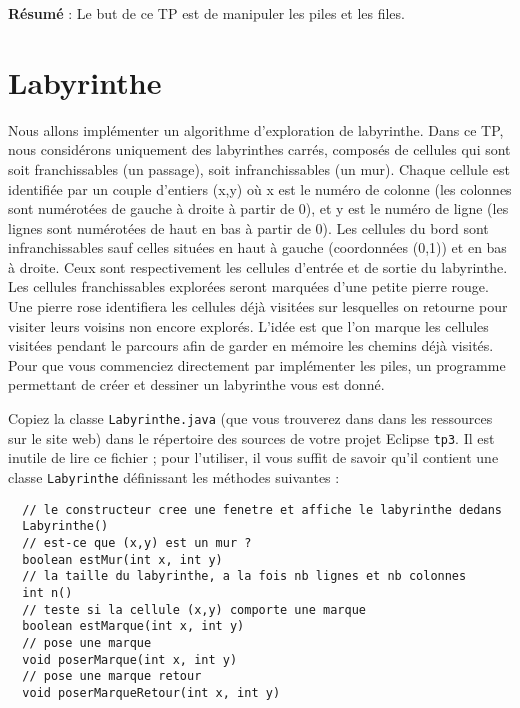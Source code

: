 \documentclass[iutinfo,a4paper,nocorrections,10pt]{ustl-tdtp}
\date{\annee{2017}--\annee{2018}}
\begin{document}
\maketitle
\thispagestyle{empty}


\sloppy
\textbf{Résumé }: Le but de ce TP est de manipuler les piles et les files.
\section{Labyrinthe}


Nous allons implémenter un algorithme d'exploration de labyrinthe. Dans ce TP, nous considérons uniquement des
labyrinthes carrés, composés de cellules qui sont soit franchissables (un passage), soit infranchissables (un mur). Chaque cellule est identifiée par un couple d’entiers (x,y) où x est le numéro de colonne (les colonnes sont numérotées de gauche
à droite à partir de 0), et y est le numéro de ligne (les lignes sont numérotées de haut en bas à partir de 0). Les
cellules du bord sont infranchissables sauf celles situées en haut à gauche (coordonnées (0,1)) et en bas à droite. Ceux sont
respectivement les cellules d'entrée et de sortie du labyrinthe.
Les cellules franchissables explorées seront marquées d’une petite pierre rouge. Une pierre rose identifiera les cellules déjà visitées sur lesquelles on retourne pour visiter leurs voisins non encore explorés. L'idée est que l'on
marque les cellules visitées pendant le parcours afin de garder en mémoire les chemins déjà visités.
Pour que vous commenciez directement par implémenter les piles, un programme permettant de créer et dessiner un
labyrinthe vous est donné.


Copiez la classe \texttt{Labyrinthe.java} (que vous trouverez dans dans les
ressources sur le site web) dans le répertoire des sources de votre projet Eclipse \texttt{tp3}. Il est inutile de lire ce fichier ; pour l'utiliser, il vous suffit de savoir qu'il contient une classe \texttt{Labyrinthe} définissant les méthodes suivantes :
\begin{verbatim}
  // le constructeur cree une fenetre et affiche le labyrinthe dedans
  Labyrinthe()
  // est-ce que (x,y) est un mur ?
  boolean estMur(int x, int y)
  // la taille du labyrinthe, a la fois nb lignes et nb colonnes
  int n()
  // teste si la cellule (x,y) comporte une marque
  boolean estMarque(int x, int y)
  // pose une marque
  void poserMarque(int x, int y)
  // pose une marque retour 
  void poserMarqueRetour(int x, int y) 
\end{verbatim}
\end{document}
